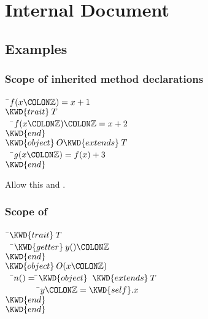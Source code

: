 %
%
%
%

\chapter{Internal Document}




\section{Examples}
\subsection{Scope of inherited method declarations}
\begin{Fortress}
{\tt~}\pushtabs\=\+\( f(x\COLON \mathbb{Z}) = x+1\)\\
\( \KWD{trait}\:T\)\\
{\tt~~}\pushtabs\=\+\(   f(x\COLON \mathbb{Z})\COLON \mathbb{Z} = x+2\)\-\\\poptabs
\( \KWD{end}\)\\
\( \KWD{object}\:O \KWD{extends}\:T\)\\
{\tt~~}\pushtabs\=\+\(   g(x\COLON \mathbb{Z}) = f(x) + 3\)\-\\\poptabs
\( \KWD{end}\)\-\\\poptabs
\end{Fortress}

Allow this and .

\subsection{Scope of }
\begin{Fortress}
{\tt~}\pushtabs\=\+\( \KWD{trait}\:T\)\\
{\tt~~}\pushtabs\=\+\(   \KWD{getter}\:y()\COLON \mathbb{Z}\)\-\\\poptabs
\( \KWD{end}\)\\
\( \KWD{object}\:O(x\COLON \mathbb{Z})\)\\
{\tt~~}\pushtabs\=\+\(   n() =  \null\)\pushtabs\=\+\(\KWD{object}\;\;\KWD{extends}\:T\)\\
{\tt~~~~~~~~}\pushtabs\=\+\(           y\COLON \mathbb{Z} = \mathord{\KWD{self}}.x\)\-\\\poptabs
\(         \KWD{end}\)\-\-\\\poptabs\poptabs
\( \KWD{end}\)\-\\\poptabs
\end{Fortress}


